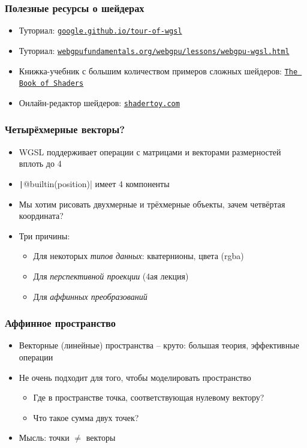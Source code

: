 \documentclass[10pt]{beamer}
\begin{document}
\begin{frame}[fragile]
\frametitle{Полезные ресурсы о шейдерах}
\begin{itemize}
\item Туториал: \href{https://google.github.io/tour-of-wgsl}{\nolinkurl{google.github.io/tour-of-wgsl}}
\item Туториал: \href{https://webgpufundamentals.org/webgpu/lessons/webgpu-wgsl.html}{\nolinkurl{webgpufundamentals.org/webgpu/lessons/webgpu-wgsl.html}}
\item Книжка-учебник с большим количеством примеров сложных шейдеров: \href{https://thebookofshaders.com/00/}{\texttt{The Book of Shaders}}
\item Онлайн-редактор шейдеров: \href{https://shadertoy.com}{\nolinkurl{shadertoy.com}}
\end{itemize}
\end{frame}

\begin{frame}[fragile]
\frametitle{Четырёхмерные векторы?}
\begin{itemize}
\item WGSL поддерживает операции с матрицами и векторами размерностей вплоть до 4
\item \texttt|@builtin(position)| имеет 4 компоненты
\pause
\item Мы хотим рисовать двухмерные и трёхмерные объекты, зачем четвёртая координата?
\pause
\item Три причины:
\pause
\begin{itemize}
\item Для некоторых \textit{типов данных}: кватернионы, цвета (rgba)
\pause
\item Для \textit{перспективной проекции} (4ая лекция)
\pause
\item Для \textit{аффинных преобразований}
\end{itemize}
\end{itemize}
\end{frame}

\begin{frame}[fragile]
\frametitle{Аффинное пространство}
\begin{itemize}
\item Векторные (линейные) пространства -- круто: большая теория, эффективные операции
\pause
\item Не очень подходит для того, чтобы моделировать пространство
\pause
\begin{itemize}
\item Где в пространстве точка, соответствующая нулевому вектору?
\pause
\item Что такое сумма двух точек?
\end{itemize}
\pause
\item Мысль: точки \begin{math}\neq\end{math} векторы
\end{itemize}
\end{frame}
\end{document}

